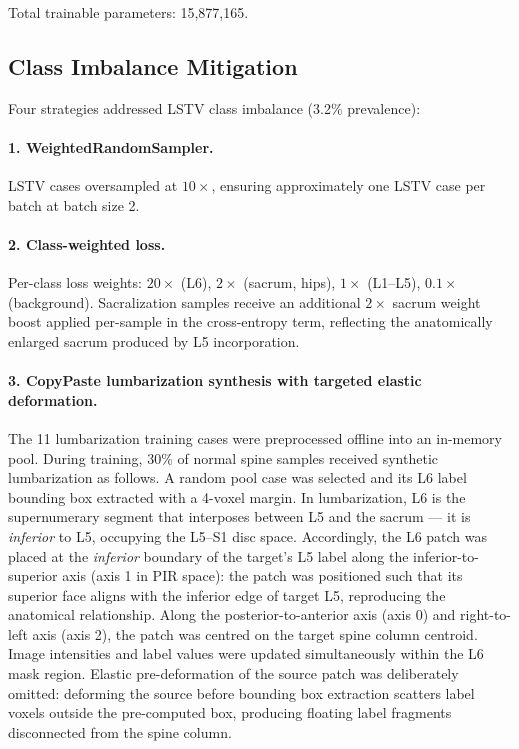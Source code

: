 \documentclass{article}
\begin{document}
Total trainable parameters: 15,877,165.

\subsection{Class Imbalance Mitigation}
\label{sec:class_imbalance}

Four strategies addressed LSTV class imbalance (3.2\% prevalence):

\paragraph{1. WeightedRandomSampler.}
LSTV cases oversampled at $10\times$, ensuring approximately one LSTV case per
batch at batch size 2.

\paragraph{2. Class-weighted loss.}
Per-class loss weights: $20\times$ (L6), $2\times$ (sacrum, hips), $1\times$
(L1--L5), $0.1\times$ (background). Sacralization samples receive an additional
$2\times$ sacrum weight boost applied per-sample in the cross-entropy term,
reflecting the anatomically enlarged sacrum produced by L5 incorporation.

\paragraph{3. CopyPaste lumbarization synthesis with targeted elastic deformation.}
The 11 lumbarization training cases were preprocessed offline into an
in-memory pool. During training, 30\% of normal spine samples received
synthetic lumbarization as follows. A random pool case was selected and its L6
label bounding box extracted with a 4-voxel margin. In lumbarization, L6 is the
supernumerary segment that interposes between L5 and the sacrum --- it is
\textit{inferior} to L5, occupying the L5--S1 disc space. Accordingly, the L6
patch was placed at the \textit{inferior} boundary of the target's L5 label along
the inferior-to-superior axis (axis 1 in PIR space): the patch was positioned
such that its superior face aligns with the inferior edge of target L5, reproducing
the anatomical relationship. Along the posterior-to-anterior axis (axis 0) and
right-to-left axis (axis 2), the patch was centred on the target spine column
centroid. Image intensities and label values were updated simultaneously within
the L6 mask region. Elastic pre-deformation of the source patch was deliberately
omitted: deforming the source before bounding box extraction scatters label voxels
outside the pre-computed box, producing floating label fragments disconnected
from the spine column.
\end{document}
